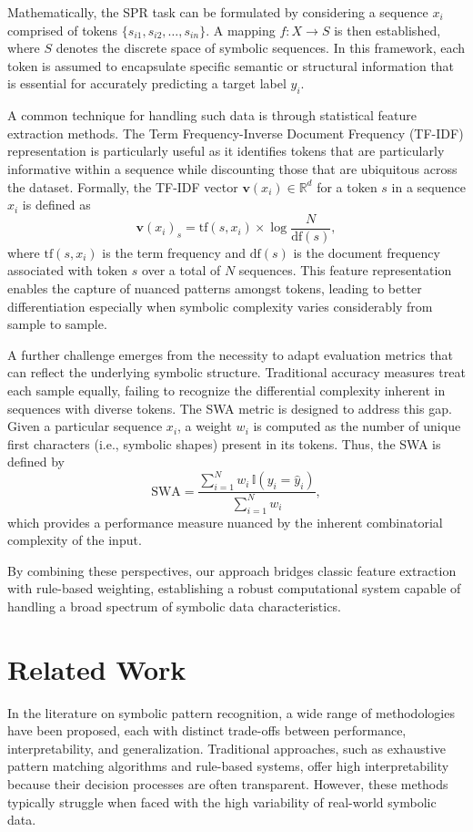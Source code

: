 \documentclass{article}
\begin{document}
Mathematically, the SPR task can be formulated by considering a sequence \(x_i\) comprised of tokens \(\{s_{i1}, s_{i2}, \ldots, s_{in}\}\). A mapping \(f: X \rightarrow S\) is then established, where \(S\) denotes the discrete space of symbolic sequences. In this framework, each token is assumed to encapsulate specific semantic or structural information that is essential for accurately predicting a target label \(y_i\). 

A common technique for handling such data is through statistical feature extraction methods. The Term Frequency-Inverse Document Frequency (TF-IDF) representation is particularly useful as it identifies tokens that are particularly informative within a sequence while discounting those that are ubiquitous across the dataset. Formally, the TF-IDF vector \(\mathbf{v}(x_i) \in \mathbb{R}^d\) for a token \(s\) in a sequence \(x_i\) is defined as 
\[
\mathbf{v}(x_i)_s = \text{tf}(s, x_i) \times \log\frac{N}{\text{df}(s)},
\]
where \(\text{tf}(s, x_i)\) is the term frequency and \(\text{df}(s)\) is the document frequency associated with token \(s\) over a total of \(N\) sequences. This feature representation enables the capture of nuanced patterns amongst tokens, leading to better differentiation especially when symbolic complexity varies considerably from sample to sample.

A further challenge emerges from the necessity to adapt evaluation metrics that can reflect the underlying symbolic structure. Traditional accuracy measures treat each sample equally, failing to recognize the differential complexity inherent in sequences with diverse tokens. The SWA metric is designed to address this gap. Given a particular sequence \(x_i\), a weight \(w_i\) is computed as the number of unique first characters (i.e., symbolic shapes) present in its tokens. Thus, the SWA is defined by
\[
\text{SWA} = \frac{\sum_{i=1}^{N} w_i\,\mathbb{I}(y_i = \hat{y}_i)}{\sum_{i=1}^{N} w_i},
\]
which provides a performance measure nuanced by the inherent combinatorial complexity of the input.

By combining these perspectives, our approach bridges classic feature extraction with rule-based weighting, establishing a robust computational system capable of handling a broad spectrum of symbolic data characteristics.

\section{Related Work}
In the literature on symbolic pattern recognition, a wide range of methodologies have been proposed, each with distinct trade-offs between performance, interpretability, and generalization. Traditional approaches, such as exhaustive pattern matching algorithms and rule-based systems, offer high interpretability because their decision processes are often transparent. However, these methods typically struggle when faced with the high variability of real-world symbolic data.
\end{document}
